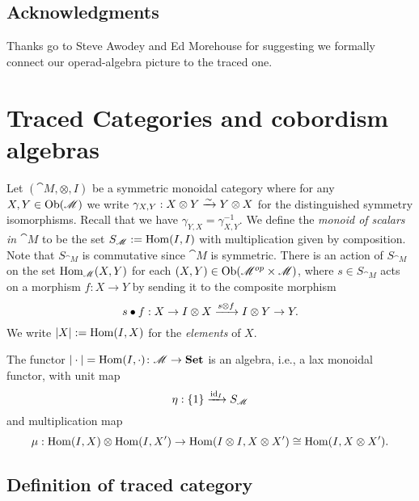 \documentclass[12pt,oneside,article,draft]{memoir}
\begin{document}
\section*{Acknowledgments}

Thanks go to Steve Awodey and Ed Morehouse for suggesting we formally connect our operad-algebra picture to the traced one. 

\chapter{Traced Categories and cobordism algebras}\label{sec:traced categories}

Let $(\cat{M},\otimes,I)$ be a symmetric monoidal category where for any $X,Y\in\operatorname{Ob}(\mathscr{M})$ we write $\gamma_{X,Y}:X\otimes Y\xrightarrow{\sim} Y\otimes X$ for the distinguished symmetry isomorphisms. Recall that we have $\gamma_{Y,X}=\gamma_{X,Y}^{-1}$.  We define the {\em monoid of scalars in $\cat{M}$} to be the set $S_{\mathscr{M}}:=\operatorname{Hom}(I,I)$ with multiplication given by composition.  Note that $S_{\cat{M}}$ is commutative since $\cat{M}$ is symmetric.  There is an action of $S_{\cat{M}}$ on the set $\operatorname{Hom}_{\mathscr{M}}(X,Y)$ for each $(X,Y)\in\operatorname{Ob}(\mathscr{M}^{op}\times\mathscr{M})$, where $s\in S_{\cat{M}}$ acts on a morphism $f\colon X\to Y$ by sending it to the composite morphism
$$s\bullet f:X\to I\otimes X\xrightarrow{s\otimes f}I\otimes Y\to Y.$$
We write $|X|:=\operatorname{Hom}(I,X)$ for the \emph{elements} of $X$.

The functor $|\cdot|=\operatorname{Hom}(I,\cdot)\colon\mathscr{M}\to\mathbf{Set}$ is an algebra, i.e., a lax monoidal functor, with unit map
\[\eta:\{1\}\xrightarrow{\operatorname{id}_{I}}S_{\mathscr{M}}\]
and multiplication map
\[\mu:\operatorname{Hom}(I,X)\otimes\operatorname{Hom}(I,X')\to\operatorname{Hom}(I\otimes I,X\otimes X')\cong\operatorname{Hom}(I,X\otimes X').\]

\section{Definition of traced category}\label{sec:define traced}
\end{document}
